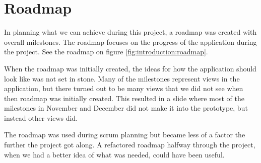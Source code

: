 \section{Roadmap}
In planning what we can achieve during this project, a roadmap was created with overall milestones. 
The roadmap focuses on the progress of the application during the project. 
See the roadmap on figure \ref{fig:introduction:roadmap}.

When the roadmap was initially created, the ideas for how the application should look like was not set in stone.
Many of the milestones represent views in the application, but there turned out to be many views that we did not see when then roadmap was initially created.
This resulted in a slide where most of the milestones in November and December did not make it into the prototype, but instead other views did.

The roadmap was used during \gls{scrum} planning but became less of a factor the further the project got along. 
A refactored roadmap halfway through the project, when we had a better idea of what was needed, could have been useful.





